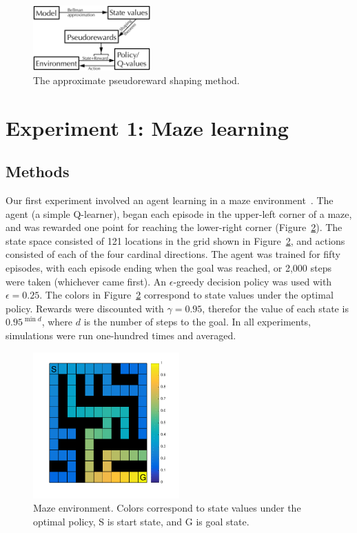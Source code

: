 \documentclass[letterpaper]{article}
\begin{document}
\begin{figure}[ht]
\centering
\includegraphics[width=0.4\textwidth]{approxPR_schematic}
\caption{The approximate pseudoreward shaping method.}
\label{fig:approxPR_schematic}
\end{figure}

\section{Experiment 1: Maze learning}

\subsection{Methods}

Our first experiment involved an agent learning in a maze environment~\cite{sutton1991dyna, sutton1991planning, peng1993efficient, sutton1998reinforcement, wiering2012reinforcement}. The agent (a simple Q-learner), began each episode in the upper-left corner of a maze, and was rewarded one point for reaching the lower-right corner (Figure~\ref{fig:maze_values}). The state space consisted of 121 locations in the grid shown in Figure~\ref{fig:maze_values}, and actions consisted of each of the four cardinal directions. The agent was trained for fifty episodes, with each episode ending when the goal was reached, or 2,000 steps were taken (whichever came first). An $\epsilon$-greedy decision policy was used with $\epsilon = 0.25$. The colors in Figure~\ref{fig:maze_values} correspond to state values under the optimal policy. Rewards were discounted with $\gamma = 0.95$, therefor the value of each state is $0.95^{\min{d}}$, where $d$ is the number of steps to the goal. In all experiments, simulations were run one-hundred times and averaged.

\begin{figure}[ht]
\centering
\includegraphics[width=0.5\textwidth]{maze_values}
\caption{Maze environment. Colors correspond to state values under the optimal policy, S is start state, and G is goal state.}
\label{fig:maze_values}
\end{figure}
\end{document}
